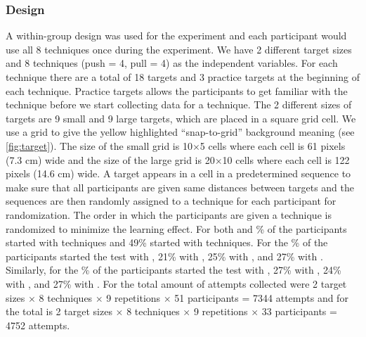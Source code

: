 \subsubsection{Design} \label{}
A within-group design was used for the experiment and each participant would use all 8 techniques once during the experiment.
We have 2 different target sizes and 8 techniques (push = 4, pull = 4) as the independent variables.
For each technique there are a total of 18 targets and 3 practice targets at the beginning of each technique. 
Practice targets allows the participants to get familiar with the technique before we start collecting data for a technique.
The 2 different sizes of targets are 9 small and 9 large targets, which are placed in a square grid cell.
We use a grid to give the yellow highlighted ``snap-to-grid'' background meaning (see \cref{fig:target}).
The size of the small grid is 10$\times$5 cells where each cell is 61 pixels (7.3 cm) wide and the size of the large grid is 20$\times$10 cells where each cell is 122 pixels (14.6 cm) wide.
A target appears in a cell in a predetermined sequence to make sure that all participants are given same distances between targets and the sequences are then randomly assigned to a technique for each participant for randomization.
The order in which the participants are given a technique is randomized to minimize the learning effect.
For both \target and \% of the participants started with \push techniques and 49\% started with \pull techniques.
For the \% of the participants started the test with \grab, 21\% with \swipe, 25\% with \throw, and 27\% with \tilt.
Similarly, for the \% of the participants started the test with \grab, 27\% with \swipe, 24\% with \throw, and 27\% with \tilt.
For \target the total amount of attempts collected were 2 target sizes $\times$ 8 techniques $\times$ 9 repetitions $\times$ 51 participants = 7344 attempts and for \accuracy the total is 2 target sizes $\times$ 8 techniques $\times$ 9 repetitions $\times$ 33 participants = 4752 attempts.


